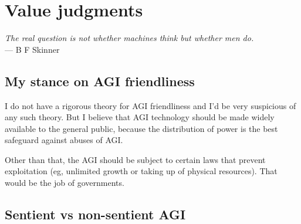 \chapter{Value judgments}
\begin{flushright}
\emph{The real question is not whether machines think but whether men do.}\\
--- B F Skinner
\end{flushright}
\minitoc

\section{My stance on AGI friendliness}

I do not have a rigorous theory for AGI friendliness and I'd be very suspicious of any such theory.  But I believe that AGI technology should be made widely available to the general public, because the distribution of power is the best safeguard against abuses of AGI.

Other than that, the AGI should be subject to certain laws that prevent exploitation (eg, unlimited growth or taking up of physical resources).  That would be the job of governments.


\section{Sentient vs non-sentient AGI}
